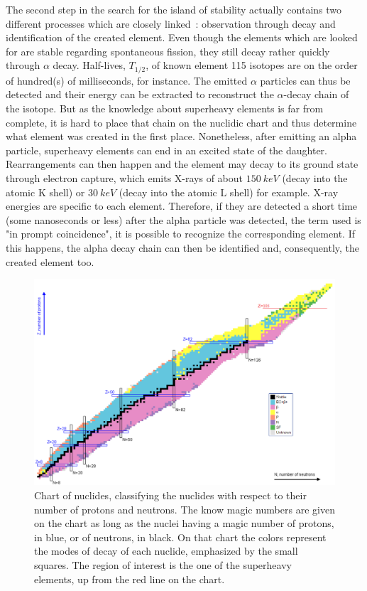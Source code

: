 \documentclass[11pt,a4paper]{article}
\begin{document}
The second step in the search for the island of stability actually contains two different processes which are closely linked~: observation through decay and identification of the created element. Even though the elements which are looked for are stable regarding spontaneous fission, they still decay rather quickly through $\alpha$ decay. Half-lives, $T_{1/2}$, of known element 115 isotopes are on the order of hundred(s) of milliseconds, for instance. The emitted $\alpha$ particles can thus be detected and their energy can be extracted to reconstruct the $\alpha$-decay chain of the isotope. But as the knowledge about superheavy elements is far from complete, it is hard to place that chain on the nuclidic chart and thus determine what element was created in the first place. Nonetheless, after emitting an alpha particle, superheavy elements can end in an excited state of the daughter. Rearrangements can then happen and the element may decay to its ground state through electron capture, which emits X-rays of about $150~keV$ (decay into the atomic K shell) or $30~keV$ (decay into the atomic L shell) for example. X-ray energies are specific to each element. Therefore, if they are detected a short time (some nanoseconds or less) after the alpha particle was detected, the term used is "in prompt coincidence", it is possible to recognize the corresponding element. If this happens, the alpha decay chain can then be identified and, consequently, the created element too.

\begin{figure}[!h]
\centering
\includegraphics[scale=0.6]{Nuclchart2.png}
\caption{Chart of nuclides, classifying the nuclides with respect to their number of protons and neutrons. The know magic numbers are given on the chart as long as the nuclei having a magic number of protons, in blue, or of neutrons, in black. On that chart the colors represent the modes of decay of each nuclide, emphasized by the small squares. The region of interest is the one of the superheavy elements, up from the red line on the chart.}
\label{Nuclchart}
\end{figure}
\end{document}
